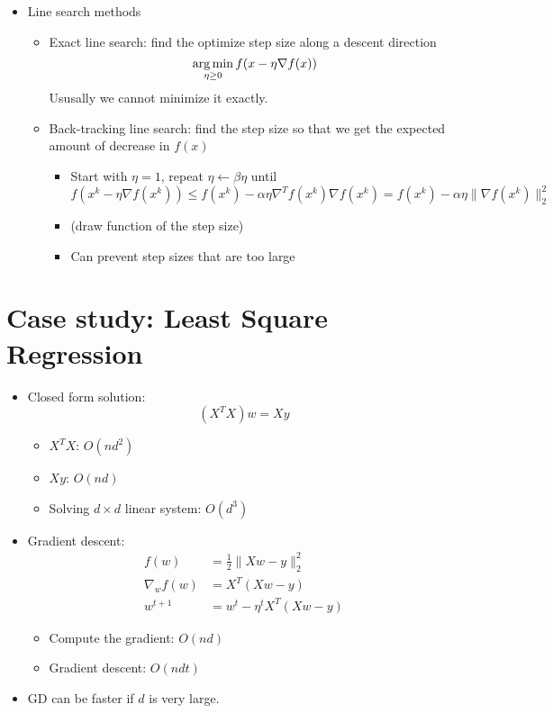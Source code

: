 \documentclass[11pt]{article}
\begin{document}
\begin{itemize}
    \item Line search methods
        \begin{itemize}
            \item Exact line search: find the optimize step size along a descent direction
                $$
                \operatorname*{arg\,min}_{\eta\ge 0} f(x - \eta\nabla f(x))
                $$
                Ususally we cannot minimize it exactly.
            \item Back-tracking line search: find the step size so that we get the expected amount of decrease in $f(x)$
                \begin{itemize}
                    \item Start with $\eta=1$, repeat $\eta\leftarrow \beta \eta$ until
                        $$
                        f(x^k - \eta\nabla f(x^k)) \le f(x^k) - \alpha \eta \nabla^T f(x^k) \nabla f(x^k)
                        = f(x^k)  - \alpha \eta \|\nabla f(x^k)\|_2^2
                        $$
                    \item (draw function of the step size)
                    \item Can prevent step sizes that are too large
                \end{itemize}
        \end{itemize}
\end{itemize}

\section{Case study: Least Square Regression}
\begin{itemize}
    \item Closed form solution:
        $$
        (X^TX)w = Xy
        $$
        \begin{itemize}
            \item $X^TX$: $O(nd^2)$
            \item $Xy$: $O(nd)$
            \item Solving $d\times d$ linear system: $O(d^3)$
        \end{itemize}
    \item Gradient descent:
        \begin{align}
            f(w) &= \frac{1}{2}\|Xw - y\|_2^2 \\
            \nabla_w f(w) &= X^T(Xw - y) \\
            w^{t+1} &= w^t - \eta^t  X^T(Xw - y)
        \end{align}
        \begin{itemize}
            \item Compute the gradient: $O(nd)$
            \item Gradient descent: $O(ndt)$
        \end{itemize}
    \item GD can be faster if $d$ is very large.
\end{itemize}
\end{document}
